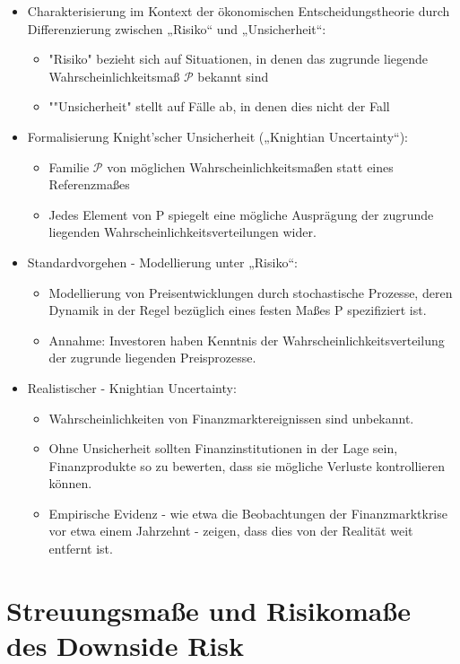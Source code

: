 \documentclass[12pt]{report}
\theoremstyle{dotless}
\theoremstyle{definition}
\begin{document}
\begin{itemize}
\item Charakterisierung im Kontext der ökonomischen Entscheidungstheorie durch
Differenzierung zwischen „Risiko“ und „Unsicherheit“:
\begin{itemize}
\item "Risiko" bezieht sich auf Situationen, in denen das zugrunde liegende
Wahrscheinlichkeitsmaß $\mathcal{P}$ bekannt sind
\item ""Unsicherheit" stellt auf Fälle ab, in denen dies nicht der Fall 
\end{itemize}
\item Formalisierung Knight’scher Unsicherheit („Knightian Uncertainty“):
\begin{itemize}
\item Familie $\mathcal{P}$ von möglichen Wahrscheinlichkeitsmaßen statt eines Referenzmaßes
\item Jedes Element von P spiegelt eine mögliche Ausprägung der zugrunde
liegenden Wahrscheinlichkeitsverteilungen wider.
\end{itemize}
\item Standardvorgehen - Modellierung unter „Risiko“:
\begin{itemize}
\item Modellierung von Preisentwicklungen durch stochastische Prozesse, deren
Dynamik in der Regel bezüglich eines festen Maßes P spezifiziert ist.
\item Annahme: Investoren haben Kenntnis der
Wahrscheinlichkeitsverteilung der zugrunde liegenden Preisprozesse.
\end{itemize}
\item Realistischer - Knightian Uncertainty:
\begin{itemize}
\item Wahrscheinlichkeiten von Finanzmarktereignissen sind unbekannt.
\item Ohne Unsicherheit sollten Finanzinstitutionen in der Lage sein, Finanzprodukte
so zu bewerten, dass sie mögliche Verluste kontrollieren können.
\item Empirische Evidenz - wie etwa die Beobachtungen der Finanzmarktkrise vor
etwa einem Jahrzehnt - zeigen, dass dies von der Realität weit entfernt ist.
\end{itemize}
\end{itemize}


\section{Streuungsmaße und Risikomaße des Downside Risk}
\end{document}
